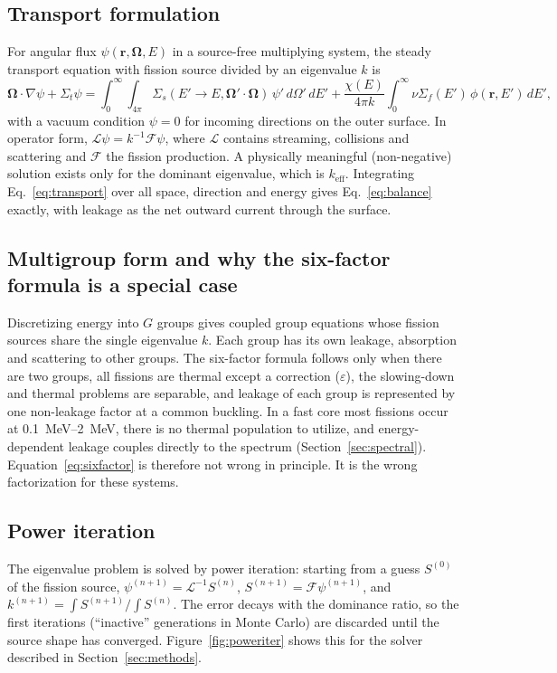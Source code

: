 \documentclass[11pt,letterpaper]{article}
\newcommand{\keff}{k_\mathrm{eff}}
\begin{document}
\subsection{Transport formulation}
For angular flux $\psi(\mathbf{r},\boldsymbol{\Omega},E)$ in a source-free multiplying system, the steady transport equation with fission source divided by an eigenvalue $k$ is \citep{BellGlasstone1970,Duderstadt1976}
\begin{equation}
  \boldsymbol{\Omega}\cdot\nabla\psi + \Sigma_t\psi
  = \int_0^\infty\!\!\int_{4\pi}\Sigma_s(E'\!\to\!E,\boldsymbol{\Omega}'\!\cdot\!\boldsymbol{\Omega})\,\psi'\,d\Omega'\,dE'
  + \frac{\chi(E)}{4\pi k}\int_0^\infty \nu\Sigma_f(E')\,\phi(\mathbf{r},E')\,dE' ,
  \label{eq:transport}
\end{equation}
with a vacuum condition $\psi=0$ for incoming directions on the outer surface. In operator form, $\mathcal{L}\psi = k^{-1}\mathcal{F}\psi$, where $\mathcal{L}$ contains streaming, collisions and scattering and $\mathcal{F}$ the fission production. A physically meaningful (non-negative) solution exists only for the dominant eigenvalue, which is $\keff$. Integrating Eq.~\eqref{eq:transport} over all space, direction and energy gives Eq.~\eqref{eq:balance} exactly, with leakage as the net outward current through the surface.

\subsection{Multigroup form and why the six-factor formula is a special case}
Discretizing energy into $G$ groups gives coupled group equations whose fission sources share the single eigenvalue $k$. Each group has its own leakage, absorption and scattering to other groups. The six-factor formula follows only when there are two groups, all fissions are thermal except a correction ($\varepsilon$), the slowing-down and thermal problems are separable, and leakage of each group is represented by one non-leakage factor at a common buckling. In a fast core most fissions occur at \SIrange{0.1}{2}{MeV}, there is no thermal population to utilize, and energy-dependent leakage couples directly to the spectrum (Section~\ref{sec:spectral}). Equation~\eqref{eq:sixfactor} is therefore not wrong in principle. It is the wrong factorization for these systems.

\subsection{Power iteration}
The eigenvalue problem is solved by power iteration: starting from a guess $S^{(0)}$ of the fission source, $\psi^{(n+1)} = \mathcal{L}^{-1}S^{(n)}$, $S^{(n+1)} = \mathcal{F}\psi^{(n+1)}$, and $k^{(n+1)} = \int S^{(n+1)}/\int S^{(n)}$. The error decays with the dominance ratio, so the first iterations (``inactive'' generations in Monte Carlo) are discarded until the source shape has converged. Figure~\ref{fig:poweriter} shows this for the solver described in Section~\ref{sec:methods}.
\end{document}
